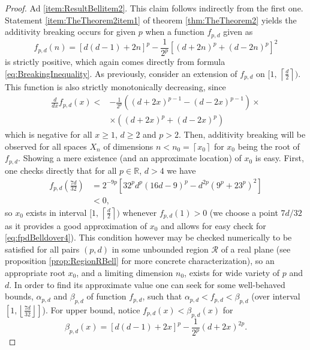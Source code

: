 \documentclass[reqno]{amsart}
\theoremstyle{plain}
\theoremstyle{note}
\newcommand{\ceil}[1]{\left\lceil #1 \right\rceil}
\newcommand{\floor}[1]{\left\lfloor #1 \right\rfloor}
\newcommand{\reals}{\mathbb{R}}
\begin{document}
\begin{proof}
Ad \ref{item:ResultBellitem2}. This claim follows indirectly from the first one. Statement \ref{item:TheTheorem2item1} of theorem \ref{thm:TheTheorem2} yields the additivity breaking occurs for given $p$ when a function $f_{p,d}$ given as
\begin{equation}
    f_{p,d}(n) = \left[d(d-1)+2n\right]^p - \frac{1}{2^p}\left[ (d+2n)^p + (d-2n)^p \right]^{2}
\end{equation}
is strictly positive, which again comes directly from formula \eqref{eq:BreakingInequality}. As previously, consider an extension of $f_{p,d}$ on $[1, \, \ceil{\frac{d}{2}})$. This function is also strictly monotonically decreasing, since
\begin{align}
    \frac{d}{dx}f_{p,d}(x) < &-\frac{1}{2^p}\left((d+2x)^{p-1}-(d-2x)^{p-1}\right)\times \\
    &\times\left((d+2x)^p + (d-2x)^p\right) \nonumber
\end{align}
which is negative for all $x\geqslant 1$, $d\geqslant 2$ and $p > 2$. Then, additivity breaking will be observed for all spaces $X_n$ of dimensions $n < n_0 = \ceil{x_0}$ for $x_0$ being the root of $f_{p,d}$. Showing a mere existence (and an approximate location) of $x_0$ is easy. First, one checks directly that for all $p\in\reals$, $d>4$ we have
\begin{align}\label{eq:fpdBelldover4}
    f_{p,d}\left(\frac{7d}{32}\right) &= 2^{-9p} \left[ 32^p d^p (16d-9)^p - d^{2p} (9^p+23^p)^2 \right] \nonumber\\
    &< 0 ,
\end{align}
so $x_0$ exists in interval $[1, \, \ceil{\frac{d}{2}})$ whenever $f_{p,d}(1) > 0$ (we choose a point $7d/32$ as it provides a good approximation of $x_0$ and allows for easy check for \eqref{eq:fpdBelldover4}). This condition however may be checked numerically to be satisfied for all pairs $(p,d)$ in some unbounded region $\mathcal{R}$ of a real plane (see proposition \ref{prop:RegionRBell} for more concrete characterization), so an appropriate root $x_0$, and a limiting dimension $n_0$, exists for wide variety of $p$ and $d$. In order to find its approximate value one can seek for some well-behaved bounds, $\alpha_{p,d}$ and $\beta_{p,d}$ of function $f_{p,d}$, such that $\alpha_{p,d} < f_{p,d} < \beta_{p,d}$ (over interval $[1,\floor{\frac{7d}{32}}]$). For upper bound, notice $f_{p,d}(x) < \beta_{p,d}(x)$ for
\begin{equation}
    \beta_{p,d}(x) = [d(d-1)+2x]^p - \frac{1}{2^p} ( d+2x )^{2p}.
\end{equation}

\end{proof}
\end{document}
